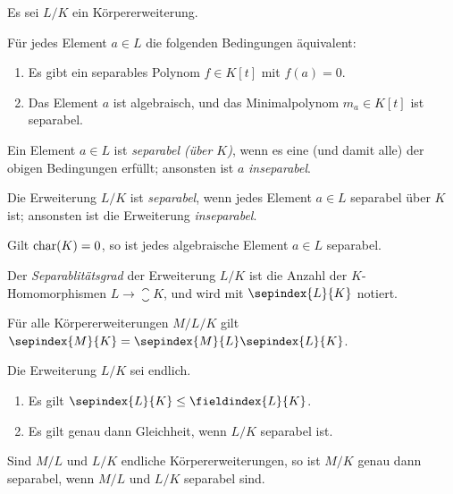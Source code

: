 Es sei $L/K$ ein Körpererweiterung.

\begin{lemma}
  Für jedes Element $a \in L$ die folgenden Bedingungen äquivalent:
  \begin{enumerate}
    \item
      Es gibt ein separables Polynom $f \in K[t]$ mit $f(a) = 0$.
    \item
      Das Element $a$ ist algebraisch, und das Minimalpolynom $m_a \in K[t]$ ist separabel.
  \end{enumerate}
\end{lemma}

\begin{definition}
  Ein Element $a \in L$ ist \emph{separabel \textup(über $K$\textup)}, wenn es eine \textup(und damit alle\textup) der obigen Bedingungen erfüllt;
  ansonsten ist $a$ \emph{inseparabel}.
  
  Die Erweiterung $L/K$ ist \emph{separabel}, wenn jedes Element $a \in L$ separabel über $K$ ist;
  ansonsten ist die Erweiterung \emph{inseparabel}.
\end{definition}

\begin{example}
  Gilt $\operatorname{char}(K) = 0$, so ist jedes algebraische Element $a \in L$ separabel.
\end{example}

\begin{definition}
  Der \emph{Separablitätsgrad} der Erweiterung $L/K$ ist die Anzahl der $K$-Homomorphismen $L \to \closure{K}$, und wird mit $\sepindex{L}{K}$ notiert.
\end{definition}

\begin{lemma}
  Für alle Körpererweiterungen $M/L/K$ gilt $\sepindex{M}{K} = \sepindex{M}{L} \sepindex{L}{K}$.
\end{lemma}

\begin{proposition}
  Die Erweiterung $L/K$ sei endlich.
  \begin{enumerate}
    \item
      Es gilt $\sepindex{L}{K} \leq \fieldindex{L}{K}$.
    \item
      Es gilt genau dann Gleichheit, wenn $L/K$ separabel ist.
  \end{enumerate}
\end{proposition}

\begin{corollary}
  Sind $M/L$ und $L/K$ endliche Körpererweiterungen, so ist $M/K$ genau dann separabel, wenn $M/L$ und $L/K$ separabel sind.
\end{corollary}

